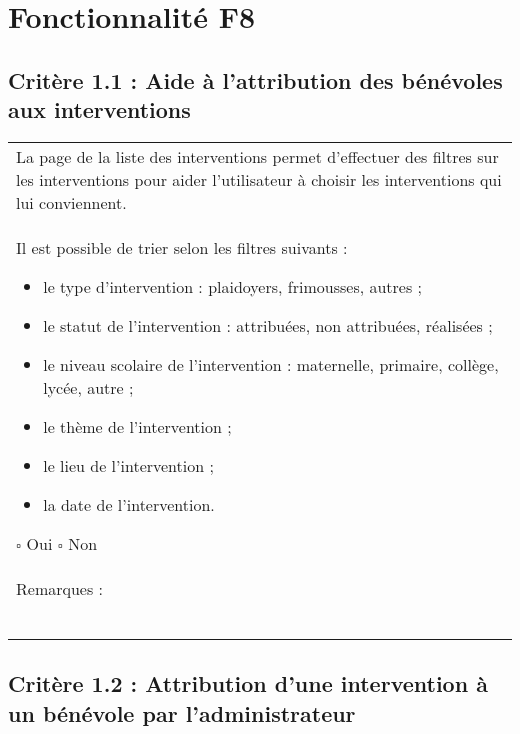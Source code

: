 
\section{Fonctionnalité F8}

	\subsection*{Critère 1.1 : Aide à l’attribution des bénévoles aux interventions}
	
		\begin{center}
    	 		\begin{tabular}[h]{|p{}|}
			\hline
				La page de la liste des interventions permet d’effectuer des filtres sur les interventions pour aider l’utilisateur à choisir les interventions qui lui conviennent.\\
Il est possible de trier selon les filtres suivants :
		\begin{itemize}
			\item le type d’intervention : plaidoyers, frimousses, autres ;
			\item le statut de l’intervention : attribuées, non attribuées, réalisées ;
			\item le niveau scolaire de l’intervention : maternelle, primaire, collège, lycée, autre ;
			\item le thème de l’intervention ;
			\item le lieu de l’intervention ;
			\item la date de l’intervention.
			
		\end{itemize}
				
				$\square$ Oui \hfill \hfill $\square$ Non \\\hline Remarques : \\ ~\\
			 \\\hline
     		\end{tabular}
  		\end{center}	

	\subsection*{Critère 1.2 : Attribution d’une intervention à un bénévole par l’administrateur}
	
